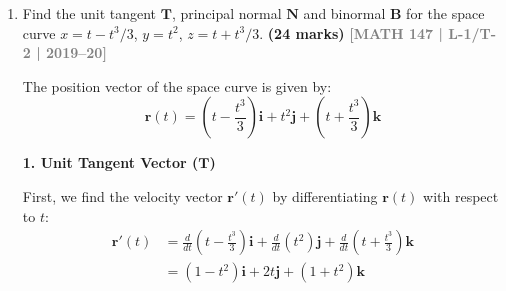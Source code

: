 \documentclass[12pt,a4paper]{article}
\newcommand{\yr}[1]{\hfill\textcolor{gray}{\small\textbf{[#1]}}}
\newcommand{\mk}[1]{\textcolor{orange!70!black}{\small\textbf{(#1 marks)}}}
\begin{document}
\begin{enumerate}
\begin{tcolorbox}[enhanced,breakable,ansbox,colback=cD!4,colframe=cD,boxrule=0.8pt,arc=5pt,title={\textbf{Answer}},fonttitle=\bfseries\color{white},colbacktitle=cD]
\vspace{1em}
\textbf{3. Vector Normal Component of Acceleration ($\mathbf{a}_N$)}

The total acceleration vector can be expressed as the sum of its tangential and normal components: $\mathbf{a} = \mathbf{a}_T + \mathbf{a}_N$.
Therefore, the vector normal component is obtained by subtracting the tangential component from the total acceleration:
\begin{align*}
    \mathbf{a}_N &= \mathbf{a}(1) - \mathbf{a}_T \\
    &= (0\,\hat{\mathbf{i}} + 2\,\hat{\mathbf{j}} + 6\,\hat{\mathbf{k}}) - \left(\frac{11}{7}\,\hat{\mathbf{i}} + \frac{22}{7}\,\hat{\mathbf{j}} + \frac{33}{7}\,\hat{\mathbf{k}}\right) \\
    &= \left(0 - \frac{11}{7}\right)\hat{\mathbf{i}} + \left(2 - \frac{22}{7}\right)\hat{\mathbf{j}} + \left(6 - \frac{33}{7}\right)\hat{\mathbf{k}} \\
    &= \left(-\frac{11}{7}\right)\hat{\mathbf{i}} + \left(\frac{14 - 22}{7}\right)\hat{\mathbf{j}} + \left(\frac{42 - 33}{7}\right)\hat{\mathbf{k}} \\
    &= \boxed{-\frac{11}{7}\,\hat{\mathbf{i}} - \frac{8}{7}\,\hat{\mathbf{j}} + \frac{9}{7}\,\hat{\mathbf{k}}}
\end{align*}

\end{tcolorbox}    

\item Find the unit tangent $\mathbf{T}$, principal normal $\mathbf{N}$ and binormal $\mathbf{B}$ for the space curve $x=t-t^{3}/3$, $y=t^{2}$, $z=t+t^{3}/3$.
\mk{24} \yr{MATH 147 | L-1/T-2 | 2019--20}

\begin{tcolorbox}[enhanced,breakable,ansbox,colback=cD!4,colframe=cD,boxrule=0.8pt,arc=5pt,title={\textbf{Answer}},fonttitle=\bfseries\color{white},colbacktitle=cD]

The position vector of the space curve is given by:
\[ \mathbf{r}(t) = \left(t - \frac{t^3}{3}\right)\mathbf{i} + t^2\mathbf{j} + \left(t + \frac{t^3}{3}\right)\mathbf{k} \]

\textbf{1. Unit Tangent Vector ($\mathbf{T}$)}

First, we find the velocity vector $\mathbf{r}'(t)$ by differentiating $\mathbf{r}(t)$ with respect to $t$:
\begin{align*}
    \mathbf{r}'(t) &= \frac{d}{dt}\left(t - \frac{t^3}{3}\right)\mathbf{i} + \frac{d}{dt}\left(t^2\right)\mathbf{j} + \frac{d}{dt}\left(t + \frac{t^3}{3}\right)\mathbf{k} \\
    &= (1 - t^2)\mathbf{i} + 2t\mathbf{j} + (1 + t^2)\mathbf{k}
\end{align*}


\end{tcolorbox}
\end{enumerate}
\end{document}
